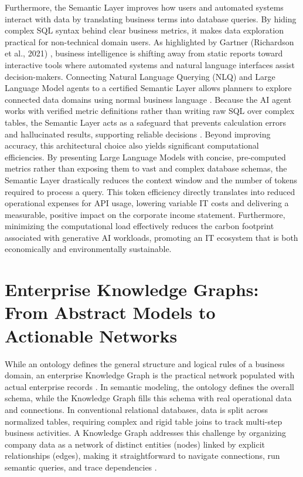 Furthermore, the Semantic Layer improves how users and automated systems interact with data by translating business terms into database queries. By hiding complex SQL 
syntax behind clear business metrics, it makes data exploration practical for non-technical domain users. 
As highlighted by Gartner (Richardson et al., 2021) \cite{gartner2021magic}, business intelligence is shifting away from static reports toward interactive tools 
where automated systems and natural language interfaces assist decision-makers. 
Connecting Natural Language Querying (NLQ) and Large Language Model agents to a certified Semantic Layer allows planners to explore connected data domains using normal 
business language \cite{potturi2025demystifying}. Because the AI agent works with verified metric definitions rather than writing raw SQL over complex tables, 
the Semantic Layer acts as a safeguard that prevents calculation errors and hallucinated results, supporting reliable decisions \cite{hilger2026bridging}.
Beyond improving accuracy, this architectural choice also yields significant computational efficiencies. By presenting Large Language Models with concise, 
pre-computed metrics rather than exposing them to vast and complex database schemas, the Semantic Layer drastically reduces the context window and the number 
of tokens required to process a query. This token efficiency directly translates into reduced operational expenses for API usage, lowering variable IT costs 
and delivering a measurable, positive impact on the corporate income statement. 
Furthermore, minimizing the computational load effectively reduces the carbon footprint associated with generative AI workloads, promoting an 
IT ecosystem that is both economically and environmentally sustainable.


\section[Enterprise Knowledge Graphs]{Enterprise Knowledge Graphs: From Abstract Models to Actionable Networks}
\label{sec:knowledge_graphs}

While an ontology defines the general structure and logical rules of a business domain, an enterprise Knowledge Graph is the practical network populated with actual 
enterprise records \cite{hogan2021knowledge}. In semantic modeling, the ontology defines the overall schema, while the Knowledge Graph fills this schema with real 
operational data and connections. In conventional relational databases, data is split across normalized tables, requiring complex and rigid table joins to track multi-step 
business activities. 
A Knowledge Graph addresses this challenge by organizing company data as a network of distinct entities (nodes) linked by explicit relationships (edges), 
making it straightforward to navigate connections, run semantic queries, and trace dependencies \cite{hogan2021knowledge}.

